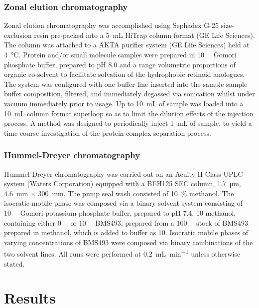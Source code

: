 \begin{refsection}
\subsubsection{Zonal elution chromatography}

Zonal elution chromatography was accomplished using Sephadex G-25 size-exclusion
resin pre-packed into a \SI{5}{\mL} HiTrap column format (GE Life Sciences). The
column was attached to a \"{A}KTA purifier system (GE Life Sciences) held at
\SI{4}{\celsius}. Protein and/or small molecule samples were prepared in
\SI{10}{\milli\moLar} Gomori phosphate buffer, prepared to pH 8.0 and a range
volumetric proportions of organic co-solvent to facilitate solvation of the
hydrophobic retinoid anologues. The system was configured with one buffer line
inserted into the sample sample buffer composition, filtered, and immediately
degassed via sonication whilst under vacuum immediately prior to usage. Up to
\SI{10}{\mL} of sample was loaded into a \SI{10}{\mL} column format superloop so
as to limit the dilution effects of the injection process. A method was designed
to periodically inject \SI{1}{\mL} of sample, to yield a time-course
investigation of the protein complex separation process.

\subsubsection{Hummel-Dreyer chromatography}

Hummel-Dreyer chromatography was carried out on an Acuity H-Class UPLC system
(Waters Corporation) equipped with a BEH125 SEC column, \SI{1.7}{\um},
\SI{4.6}{\mm} ${\times}$ \SI{300}{\mm}. The pump seal wash consisted of
\SI{10}{\percent} methanol. The isocratic mobile phase was composed via a binary
solvent system consisting of \SI{10}{\milli\moLar} Gomori potassium phosphate
buffer, prepared to pH 7.4, \SI{10}{\volper} methanol, containing either
\SI{0}{\micro\moLar} or \SI{10}{\micro\moLar} BMS493, prepared from a
\SI{100}{\micro\moLar} stock of BMS493 prepared in methanol, which is added to
buffer as \SI{10}{\volper}. Isocratic mobile phases of varying concentrations of
BMS493 were composed via binary combinations of the two solvent lines. All runs
were performed at \SI{0.2}{\mL\per\minute} unless otherwise stated.

\section{Results}


\end{refsection}
